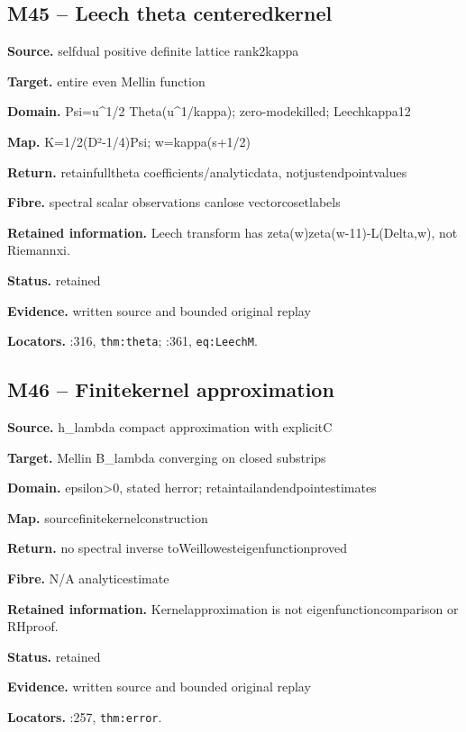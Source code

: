\subsection*{M45 -- Leech theta centeredkernel}
\noindent\textbf{Source.} selfdual positive definite lattice rank2kappa\par
\noindent\textbf{Target.} entire even Mellin function\par
\noindent\textbf{Domain.} Psi=u\textasciicircum{}1/2 Theta(u\textasciicircum{}1/kappa); zero-modekilled; Leechkappa12\par
\noindent\textbf{Map.} K=1/2(D²-1/4)Psi; w=kappa(s+1/2)\par
\noindent\textbf{Return.} retainfulltheta coefficients/analyticdata, notjustendpointvalues\par
\noindent\textbf{Fibre.} spectral scalar observations canlose vectorcosetlabels\par
\noindent\textbf{Retained information.} Leech transform has zeta(w)zeta(w-11)-L(Delta,w), not Riemannxi.\par
\noindent\textbf{Status.} retained\par
\noindent\textbf{Evidence.} written source and bounded original replay\par
\noindent\textbf{Locators.} :316, \texttt{thm:theta}; :361, \texttt{eq:LeechM}.
\subsection*{M46 -- Finitekernel approximation}
\noindent\textbf{Source.} h\_lambda compact approximation with explicitC\par
\noindent\textbf{Target.} Mellin B\_lambda converging on closed substrips\par
\noindent\textbf{Domain.} epsilon>0, stated herror; retaintailandendpointestimates\par
\noindent\textbf{Map.} sourcefinitekernelconstruction\par
\noindent\textbf{Return.} no spectral inverse toWeillowesteigenfunctionproved\par
\noindent\textbf{Fibre.} N/A analyticestimate\par
\noindent\textbf{Retained information.} Kernelapproximation is not eigenfunctioncomparison or RHproof.\par
\noindent\textbf{Status.} retained\par
\noindent\textbf{Evidence.} written source and bounded original replay\par
\noindent\textbf{Locators.} :257, \texttt{thm:error}.

